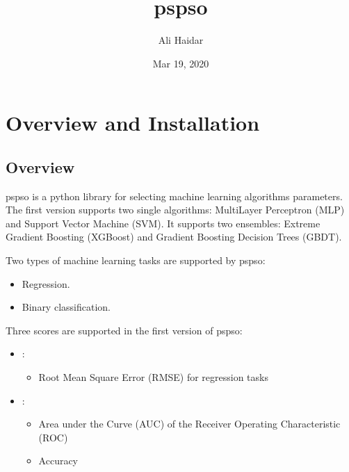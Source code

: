 \documentclass[letterpaper,10pt,english]{sphinxmanual}
\title{pspso}
\date{Mar 19, 2020}
\author{Ali Haidar}
\begin{document}
\pagestyle{empty}
\sphinxmaketitle
\pagestyle{plain}
\sphinxtableofcontents
\pagestyle{normal}
\label{\detokenize{index::doc}}




\chapter{Overview and Installation}
\label{\detokenize{index:overview-and-installation}}

\section{Overview}
\label{\detokenize{index:overview}}
pspso is a python library for selecting machine learning algorithms
parameters. The first version supports two single algorithms:
Multi\sphinxhyphen{}Layer Perceptron (MLP) and Support Vector Machine (SVM). It
supports two ensembles: Extreme Gradient Boosting (XGBoost) and Gradient
Boosting Decision Trees (GBDT).

Two types of machine learning tasks are supported by pspso:
\begin{itemize}
\item {} 
Regression.

\item {} 
Binary classification.

\end{itemize}

Three scores are supported in the first version of pspso:
\begin{itemize}
\item {} 
 :
\begin{itemize}
\item {} 
Root Mean Square Error (RMSE) for regression tasks

\end{itemize}

\item {} 
 :
\begin{itemize}
\item {} 
Area under the Curve (AUC) of the Receiver Operating Characteristic (ROC)

\item {} 
Accuracy

\end{itemize}

\end{itemize}
\end{document}
